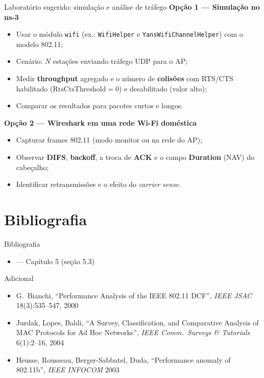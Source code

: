 \documentclass[aspectratio=169,11pt]{beamer}
\begin{document}
\begin{frame}{Laboratório sugerido: simulação e análise de tráfego}
  \textbf{Opção 1 --- Simulação no ns-3}
  \begin{itemize}
    \item Usar o módulo \texttt{wifi} (ex.: \texttt{WifiHelper} e \texttt{YansWifiChannelHelper}) com o modelo 802.11;
    \item Cenário: $N$ estações enviando tráfego UDP para o AP;
    \item Medir \textbf{throughput} agregado e o número de \textbf{colisões} com RTS/CTS habilitado ($\mathrm{RtsCtsThreshold}=0$) e desabilitado (valor alto);
    \item Comparar os resultados para pacotes curtos e longos.
  \end{itemize}
  \textbf{Opção 2 --- Wireshark em uma rede Wi-Fi doméstica}
  \begin{itemize}
    \item Capturar frames 802.11 (modo monitor ou na rede do AP);
    \item Observar \textbf{DIFS}, \textbf{backoff}, a troca de \textbf{ACK} e o campo \textbf{Duration} (NAV) do cabeçalho;
    \item Identificar retransmissões e o efeito do \emph{carrier sense}.
  \end{itemize}
\end{frame}

\section{Bibliografia}

\begin{frame}{Bibliografia}
  \begin{itemize}
    \item \textbf{\kurose{}} --- Capítulo 5 (seção 5.3)
  \end{itemize}
  \begin{block}{Adicional}
    \begin{itemize}
      \item G.\ Bianchi, ``Performance Analysis of the IEEE 802.11 DCF'', \emph{IEEE JSAC} 18(3):535--547, 2000
      \item Jurdak, Lopes, Baldi, ``A Survey, Classification, and Comparative Analysis of MAC Protocols for Ad Hoc Networks'', \emph{IEEE Comm.\ Surveys \& Tutorials} 6(1):2--16, 2004
      \item Heusse, Rousseau, Berger-Sabbatel, Duda, ``Performance anomaly of 802.11b'', \emph{IEEE INFOCOM} 2003
    \end{itemize}
  \end{block}
\end{frame}
\end{document}
